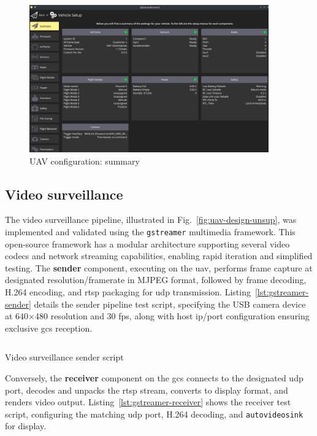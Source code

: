 \begin{figure}[!hbt]
  \centering
  \includegraphics[width=0.92\textwidth]{./img/png/qgc-summary} 
  \caption{UAV configuration: summary}
  \label{fig:uav-cfg-summary}
\end{figure}

\subsection{Video surveillance}
\label{sec:video-surveillance}
The video surveillance pipeline,  illustrated in
Fig.~\ref{fig:uav-design-unsup}, was implemented and validated using the
\lstinline{gstreamer} multimedia framework. This open-source framework has a
modular architecture supporting several video codecs and network streaming
capabilities, enabling rapid iteration and simplified testing.
%
The \textbf{sender} component, executing on the \gls{uav}, performs frame
capture at designated resolution/framerate in MJPEG format, followed by frame
decoding, H.264 encoding, and \gls{rtsp} packaging for \gls{udp} transmission.
Listing~\ref{lst:gstreamer-sender} details the sender pipeline test script,
specifying the USB camera device at 640×480 resolution and 30 \gls{fps}, along
with host \gls{ip}/port configuration ensuring exclusive \gls{gcs} reception.

\begin{longlisting}
\centering
\inputminted[]{bash}{./listing/gstreamerSender.sh}
\caption{Video surveillance sender script}
\label{lst:gstreamer-sender}
\end{longlisting}

Conversely, the \textbf{receiver} component on the \gls{gcs} connects to the designated \gls{udp} port, decodes and unpacks the \gls{rtsp} stream, converts to display format, and renders video output.
Listing~\ref{lst:gstreamer-receiver} shows the receiver test script, configuring the matching \gls{udp} port, H.264 decoding, and \lstinline{autovideosink} for display.

